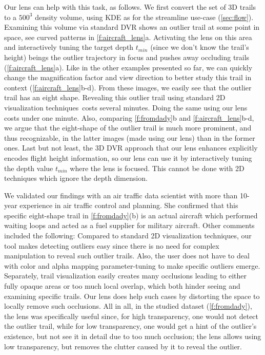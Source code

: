 Our lens can help with this task, as follows. We first convert the set of 3D trails to a $500^3$ density volume, using KDE as for the streamline use-case (\autoref{sec:flow}). Examining this volume via standard DVR shows an outlier trail at some point in space, see curved patterns in \autoref{f:aircraft_lens}a. Activating the lens on this area and interactively tuning the target depth $t_{min}$ (since we don't know the trail's height) beings the outlier trajectory in focus and pushes away occluding trails (\autoref{f:aircraft_lens}a). Like in the other examples presented so far, we can quickly change the magnification factor and view direction to better study this trail in context (\autoref{f:aircraft_lens}b-d). From these images, we easily see that the outlier trail has an eight shape. Revealing this outlier trail using standard 2D visualization techniques\,\cite{hurter2009fromdady} costs several minutes. Doing the same using our lens costs under one minute. Also, comparing \autoref{f:fromdady}b and \autoref{f:aircraft_lens}b-d, we argue that the eight-shape of the outlier trail is much more prominent, and thus recognizable, in the latter images (made using our lens) than in the former ones. Last but not least, the 3D DVR approach that our lens enhances explicitly encodes flight height information, so our lens can use it by interactively tuning the depth value $t_{min}$ where the lens is focused. This cannot be done with 2D techniques which ignore the depth dimension.

We validated our findings with an air traffic data scientist with more than 10-year experience in air traffic control and planning. She confirmed that this specific eight-shape trail in \autoref{f:fromdady}(b) is an actual aircraft which performed waiting loops and acted as a fuel supplier for military aircraft. Other comments included the following: Compared to standard 2D visualization techniques, our tool makes detecting outliers easy since there is no need for complex manipulation to reveal such outlier trails. Also, the user does not have to deal with color and alpha mapping parameter-tuning to make specific outliers emerge. Separately, trail visualization easily creates many occlusions leading to either fully opaque areas or too much local overlap, which both hinder seeing and examining specific trails. Our lens does help such cases by distorting the space to locally remove such occlusions. All in all, in the studied dataset (\autoref{f:fromdady}), the lens was specifically useful since, for high transparency, one would not detect the outlier trail, while for low transparency, one would get a hint of the outlier's existence, but not see it in detail due to too much occlusion; the lens allows using low transparency, but removes the clutter caused by it to reveal the outlier.


